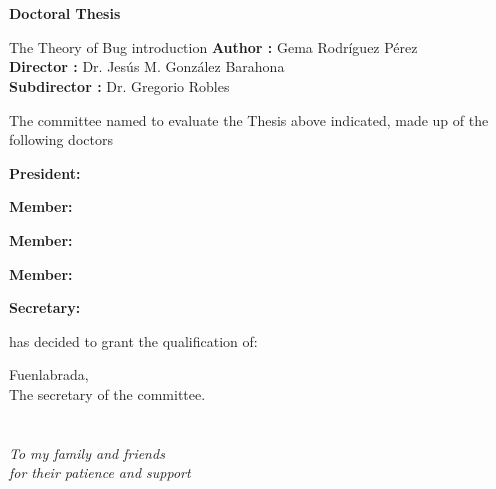 \documentclass[a4paper, 12pt]{book}
\begin{document}
\chapter*{}

\vspace{-4cm}
\begin{center}
\LARGE
\textbf{Doctoral Thesis}

\vspace{1cm}
\large
The Theory of Bug introduction
\large
\textbf{Author :} Gema Rodr\'iguez P\'erez \\
\textbf{Director :} Dr. Jes\'us M. Gonz\'alez Barahona\\
\textbf{Subdirector :} Dr. Gregorio Robles

\end{center}

\vspace{1cm}
The committee named to evaluate the Thesis above indicated, made up of the following doctors

\vspace{0.5cm}
\textbf{President:}

\vspace{0.5cm}
\textbf{Member:}

\vspace{0.5cm}
\textbf{Member:}

\vspace{0.5cm}
\textbf{Member:}

\vspace{0.5cm}
\textbf{Secretary:}


\vspace{1.2cm}
has decided to grant the qualification of:



\vspace{1cm}
\begin{flushright}
Fuenlabrada,  \qquad$\;\,$  \qquad\qquad\qquad{}\\
\vspace{0.5cm}
The secretary of the committee.
\end{flushright}



\chapter*{}
\begin{flushright}
\textit{To my family and friends \\
for their patience and support }
\end{flushright}
\end{document}
